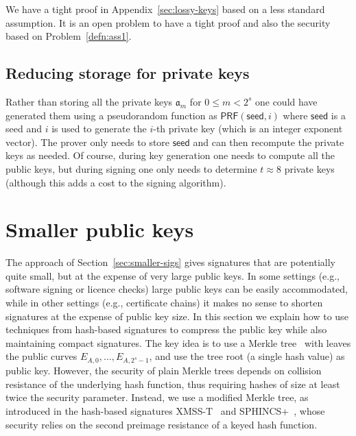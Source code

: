 \documentclass{llncs}
\newcommand{\seed}{\mathsf{seed}}
\renewcommand{\a}{\mathfrak{a}}
\newcommand{\PRF}{\mathsf{PRF}}
\begin{document}
We have a tight proof in Appendix~\ref{sec:lossy-keys} based on a less standard assumption. It is an open problem to have a tight proof and also the security based on Problem~\ref{defn:ass1}.





\subsection{Reducing storage for private keys}\label{sec:private-key-compress}

Rather than storing all the private keys $\a_m$ for $0 \le m < 2^s$ one could have generated them using a pseudorandom function as $\PRF( \seed, i )$ where $\seed$ is a seed and $i$ is used to generate the $i$-th private key (which is an integer exponent vector).
The prover only needs to store $\seed$ and can then recompute the private keys as needed.
Of course, during key generation one needs to compute all the public keys, but during signing one only needs to determine $t \approx 8$ private keys (although this adds a cost to the signing algorithm).




\section{Smaller public keys} \label{sec:smaller-keys}

The approach of Section~\ref{sec:smaller-sigs} gives signatures that are potentially quite small, but at the expense of very large public keys. In some settings (e.g., software signing or licence checks) large public keys can be easily accommodated, while in other settings (e.g., certificate chains) it makes no sense to shorten signatures at the expense of public key size.
In this section we explain how to use techniques from hash-based signatures to compress the public key while also maintaining compact signatures.
The key idea is to use a Merkle tree~\cite{10.1007/0-387-34805-0_21} with leaves the public curves $E_{A,0}, \dots, E_{A,2^s-1}$, and use the tree root (a single hash value) as public key.
However, the security of plain Merkle trees depends on collision resistance of the underlying hash function, thus requiring hashes of size at least twice the security parameter.
Instead, we use a modified Merkle tree, as introduced in the hash-based signatures XMSS-T~\cite{10.1007/978-3-662-49384-7_15} and SPHINCS+~\cite{sphincs+}, whose security relies on the second preimage resistance of a keyed hash function.
\end{document}
